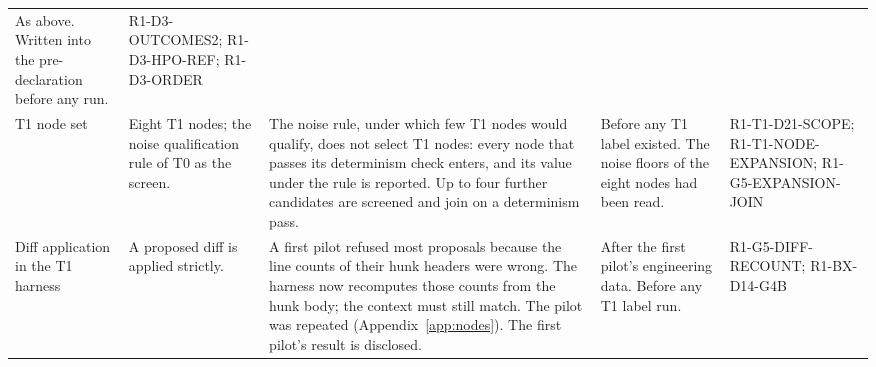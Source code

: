 \begin{table}[t]
\begin{tabular}{L{0.8in}L{1.3in}L{1.9in}L{1.25in}L{0.98in}}
As above. Written into the pre-declaration before any run. &
R1-D3-OUTCOMES2; R1-D3-HPO-REF; R1-D3-ORDER \\
\addlinespace
T1 node set &
Eight T1 nodes; the noise qualification rule of T0 as the screen. &
The noise rule, under which few T1 nodes would qualify, does not select T1 nodes: every node that passes its determinism check enters, and its value under the rule is reported. Up to four further candidates are screened and join on a determinism pass. &
Before any T1 label existed. The noise floors of the eight nodes had been read. &
R1-T1-D21-SCOPE; R1-T1-NODE-EXPANSION; R1-G5-EXPANSION-JOIN \\
\addlinespace
Diff application in the T1 harness &
A proposed diff is applied strictly. &
A first pilot refused most proposals because the line counts of their hunk headers were wrong. The harness now recomputes those counts from the hunk body; the context must still match. The pilot was repeated (Appendix~\ref{app:nodes}). The first pilot's result is disclosed. &
After the first pilot's engineering data. Before any T1 label run. &
R1-G5-DIFF-RECOUNT; R1-BX-D14-G4B \\
\bottomrule
\end{tabular}
\end{table}

